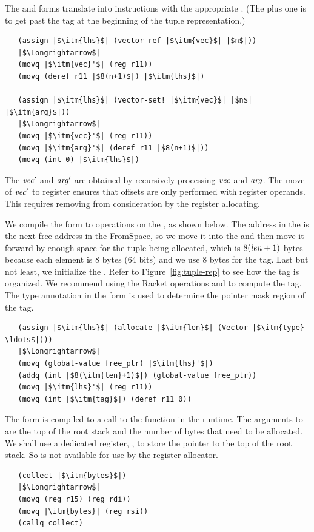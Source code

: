 \documentclass[11pt]{book}
\begin{document}
The  and  forms translate into
 instructions with the appropriate .  (The
plus one is to get past the tag at the beginning of the tuple
representation.)
\begin{lstlisting}
   (assign |$\itm{lhs}$| (vector-ref |$\itm{vec}$| |$n$|))
   |$\Longrightarrow$|
   (movq |$\itm{vec}'$| (reg r11))
   (movq (deref r11 |$8(n+1)$|) |$\itm{lhs}$|)

   (assign |$\itm{lhs}$| (vector-set! |$\itm{vec}$| |$n$| |$\itm{arg}$|))
   |$\Longrightarrow$|
   (movq |$\itm{vec}'$| (reg r11))
   (movq |$\itm{arg}'$| (deref r11 |$8(n+1)$|))
   (movq (int 0) |$\itm{lhs}$|)
\end{lstlisting}
The $\mathit{vec}'$ and $\mathit{arg}'$ are obtained by recursively
processing $\mathit{vec}$ and $\mathit{arg}$.  The move of $\mathit{vec}'$ to
register  ensures that offsets are only performed with
register operands. This requires removing  from
consideration by the register allocating.

We compile the  form to operations on the
, as shown below. The address in the 
is the next free address in the FromSpace, so we move it into the
 and then move it forward by enough space for the tuple being
allocated, which is $8(\mathit{len}+1)$ bytes because each element is 8
bytes (64 bits) and we use 8 bytes for the tag. Last but not least, we
initialize the . Refer to Figure~\ref{fig:tuple-rep} to see
how the tag is organized. We recommend using the Racket operations
 and  to compute the tag.
The type annotation in the  form is used to determine the
pointer mask region of the tag.
\begin{lstlisting}
   (assign |$\itm{lhs}$| (allocate |$\itm{len}$| (Vector |$\itm{type} \ldots$|)))
   |$\Longrightarrow$|
   (movq (global-value free_ptr) |$\itm{lhs}'$|)
   (addq (int |$8(\itm{len}+1)$|) (global-value free_ptr))
   (movq |$\itm{lhs}'$| (reg r11))
   (movq (int |$\itm{tag}$|) (deref r11 0))
\end{lstlisting}

The  form is compiled to a call to the 
function in the runtime. The arguments to  are the top
of the root stack and the number of bytes that need to be allocated.
We shall use a dedicated register, , to store the pointer to
the top of the root stack. So  is not available for use by
the register allocator.
\begin{lstlisting}
   (collect |$\itm{bytes}$|)
   |$\Longrightarrow$|
   (movq (reg r15) (reg rdi))
   (movq |\itm{bytes}| (reg rsi))
   (callq collect)
\end{lstlisting}
\end{document}
